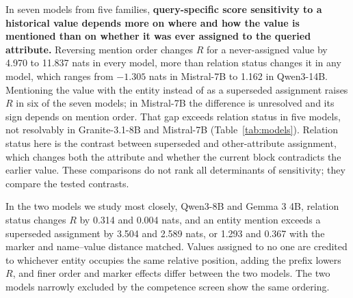 In seven models from five families, \textbf{query-specific score sensitivity to a historical value depends more on where and how the value is mentioned than on whether it was ever assigned to the queried attribute.} Reversing mention order changes $R$ for a never-assigned value by 4.970 to 11.837 nats in every model, more than relation status changes it in any model, which ranges from $-1.305$ nats in Mistral-7B to 1.162 in Qwen3-14B. Mentioning the value with the entity instead of as a superseded assignment raises $R$ in six of the seven models; in Mistral-7B the difference is unresolved and its sign depends on mention order. That gap exceeds relation status in five models, not resolvably in Granite-3.1-8B and Mistral-7B (Table~\ref{tab:models}). Relation status here is the contrast between superseded and other-attribute assignment, which changes both the attribute and whether the current block contradicts the earlier value. These comparisons do not rank all determinants of sensitivity; they compare the tested contrasts.

In the two models we study most closely, Qwen3-8B and Gemma 3 4B, relation status changes $R$ by 0.314 and 0.004 nats, and an entity mention exceeds a superseded assignment by 3.504 and 2.589 nats, or 1.293 and 0.367 with the marker and name--value distance matched. Values assigned to no one are credited to whichever entity occupies the same relative position, adding the prefix  lowers $R$, and finer order and marker effects differ between the two models. The two models narrowly excluded by the competence screen show the same ordering.

